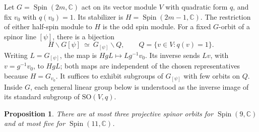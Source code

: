 \documentclass{article}
\newtheorem{proposition}[theorem]{Proposition}
\theoremstyle{definition}
\theoremstyle{remark}
\newcommand{\C}{\mathbb C}
\newcommand{\Spin}{\operatorname{Spin}}
\begin{document}
Let $G=\Spin(2m,\C)$ act on its vector module $V$ with quadratic form
$q$, and fix $v_0$ with $q(v_0)=1$. Its stabilizer is
$H=\Spin(2m-1,\C)$. The restriction of either half-spin module to $H$
is the odd spin module. For a fixed $G$-orbit of a spinor line $[\psi]$,
there is a bijection
\begin{equation}
 H\backslash G[\psi]\ \simeq\
 G_{[\psi]}\backslash Q,
 \qquad Q=\{v\in V:q(v)=1\}.
 \label{eq:odd-double-cosets}
\end{equation}
Writing $L=G_{[\psi]}$, the map is
$HgL\mapsto Lg^{-1}v_0$. Its inverse sends $Lv$, with
$v=g^{-1}v_0$, to $HgL$; both maps are independent of the chosen
representatives because $H=G_{v_0}$.
It suffices to exhibit subgroups of $G_{[\psi]}$ with few orbits on $Q$.
Inside $G$, each general linear group below is understood as the inverse
image of its standard subgroup of $\mathrm{SO}(V,q)$.

\begin{proposition}
\label{prop:odd-orbit-bound}
There are at most three projective spinor orbits for $\Spin(9,\C)$
and at most five for $\Spin(11,\C)$.
\end{proposition}
\end{document}
